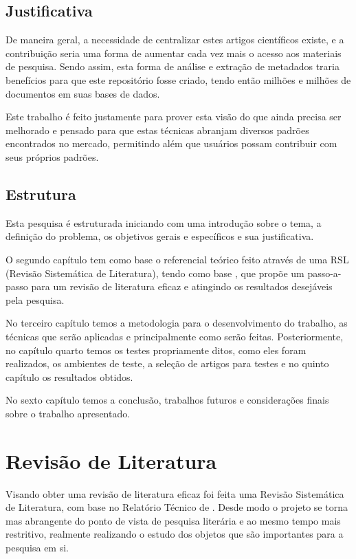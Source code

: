 \documentclass[
	12pt,               %
	openright,          %
	twoside,            %
	a4paper,            %
	english,            %
	brazil              %
	]{abntex2}
\begin{document}
\section{Justificativa}

De maneira geral, a necessidade de centralizar estes artigos científicos existe, e a contribuição seria uma forma de aumentar cada vez mais o acesso aos materiais de pesquisa. Sendo assim, esta forma de análise e extração de metadados traria benefícios para que este repositório fosse criado, tendo então milhões e milhões de documentos em suas bases de dados.

Este trabalho é feito justamente para prover esta visão do que ainda precisa ser melhorado e pensado para que estas técnicas abranjam diversos padrões encontrados no mercado, permitindo além que usuários possam contribuir com seus próprios padrões.

\section{Estrutura}

Esta pesquisa é estruturada iniciando com uma introdução sobre o tema, a definição do problema, os objetivos gerais e específicos e sua justificativa.

O segundo capítulo tem como base o referencial teórico feito através de uma RSL (Revisão Sistemática de Literatura), tendo como base \cite{rsl-manual}, que propõe um passo-a-passo para um revisão de literatura eficaz e atingindo os resultados desejáveis pela pesquisa.

No terceiro capítulo temos a metodologia para o desenvolvimento do trabalho, as técnicas que serão aplicadas e principalmente como serão feitas. Posteriormente, no capítulo quarto temos os testes propriamente ditos, como eles foram realizados, os ambientes de teste, a seleção de artigos para testes e no quinto capítulo os resultados obtidos.

No sexto capítulo temos a conclusão, trabalhos futuros e considerações finais sobre o trabalho apresentado.

\chapter{Revisão de Literatura}


Visando obter uma revisão de literatura eficaz foi feita uma Revisão Sistemática de Literatura, com base no Relatório Técnico de \cite{rsl-manual}. Desde modo o projeto se torna mas abrangente do ponto de vista de pesquisa literária e ao mesmo tempo mais restritivo, realmente realizando o estudo dos objetos que são importantes para a pesquisa em si.
\end{document}
